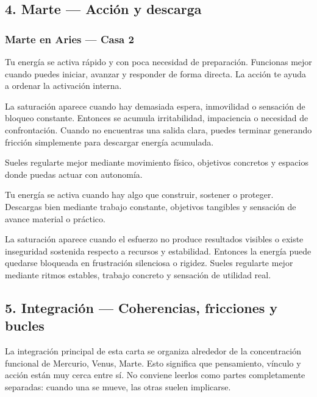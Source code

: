 \documentclass[11pt,a4paper]{article}
\begin{document}
\vspace{0.8cm}

\subsection{4. Marte — Acción y descarga}

\subsubsection*{Marte en Aries — Casa 2}

\RaggedRight
Tu energía se activa rápido y con poca necesidad de preparación. Funcionas mejor cuando puedes iniciar, avanzar y responder de forma directa. La acción te ayuda a ordenar la activación interna.

La saturación aparece cuando hay demasiada espera, inmovilidad o sensación de bloqueo constante. Entonces se acumula irritabilidad, impaciencia o necesidad de confrontación. Cuando no encuentras una salida clara, puedes terminar generando fricción simplemente para descargar energía acumulada.

Sueles regularte mejor mediante movimiento físico, objetivos concretos y espacios donde puedas actuar con autonomía.

Tu energía se activa cuando hay algo que construir, sostener o proteger. Descargas bien mediante trabajo constante, objetivos tangibles y sensación de avance material o práctico.

La saturación aparece cuando el esfuerzo no produce resultados visibles o existe inseguridad sostenida respecto a recursos y estabilidad. Entonces la energía puede quedarse bloqueada en frustración silenciosa o rigidez. Sueles regularte mejor mediante ritmos estables, trabajo concreto y sensación de utilidad real.

\vspace{0.8cm}

\subsection{5. Integración — Coherencias, fricciones y bucles}

\RaggedRight
La integración principal de esta carta se organiza alrededor de la concentración funcional de Mercurio, Venus, Marte. Esto significa que pensamiento, vínculo y acción están muy cerca entre sí. No conviene leerlos como partes completamente separadas: cuando una se mueve, las otras suelen implicarse.
\end{document}
